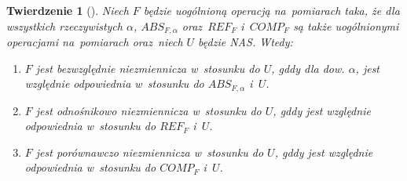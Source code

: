 \documentclass[12pt,a4paper]{report}
\newtheorem{tw}[definition]{Twierdzenie}
\begin{document}
\begin{tw} [{\citep[Tw. 3]{adams1965theory}}]
Niech $F$ będzie uogólnioną operacją na~pomiarach taka, że dla wszystkich rzeczywistych $\alpha$, $ABS_{F,\alpha}$ oraz~$REF_{F}$ i~$COMP_{F}$ są także uogólnionymi operacjami na~pomiarach oraz~niech $U$ będzie NAS. Wtedy:
\begin{enumerate}
\item
$F$ jest bezwzględnie niezmiennicza w~stosunku do $U$, gddy dla dow. $\alpha$, jest względnie odpowiednia w~stosunku do $ABS_{F,\alpha}$ i~$U$.
\item
$F$ jest odnośnikowo niezmiennicza w~stosunku do $U$, gddy jest względnie odpowiednia w~stosunku do $REF_{F}$ i~$U$.  
\item
$F$ jest porównawczo niezmiennicza w~stosunku do $U$, gddy jest względnie odpowiednia w~stosunku do $COMP_{F}$ i~$U$.    
\end{enumerate}
\end{tw}
\end{document}
